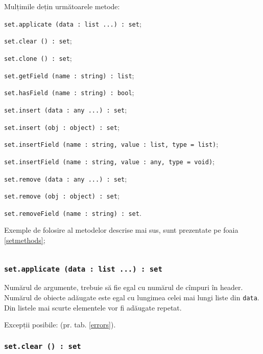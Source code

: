 Mulțimile dețin următoarele metode:
\begin{icItems}
\item \texttt{set.applicate (data : list ...) : set};
\item \texttt{set.clear () : set};
\item \texttt{set.clone () : set};
\item \texttt{set.getField (name : string) : list};
\item \texttt{set.hasField (name : string) : bool};
\item \texttt{set.insert (data : any ...) : set};
\item \texttt{set.insert (obj : object) : set};
\item \texttt{set.insertField (name : string, value : list, type = list)};
\item \texttt{set.insertField (name : string, value : any, type = void)};
\item \texttt{set.remove (data : any ...) : set};
\item \texttt{set.remove (obj : object) : set};
\item \texttt{set.removeField (name : string) : set}.
\end{icItems}

Exemple de folosire al metodelor descrise mai sus, sunt prezentate pe foaia \ref{setmethods};

\begin{sourcecode}
\label{setmethods}
\inputminted[linenos]{icl}{../sources/setmethods.icL}
\end{sourcecode}

\subsubsection{\texttt{set.applicate (data : list ...) : set}}

Numărul de argumente, trebuie să fie egal cu numărul de cîmpuri în header. Numărul de obiecte adăugate este egal cu lungimea celei mai lungi liste din \texttt{data}. Din listele mai scurte elementele vor fi adăugate repetat.

Excepții posibile:  (pr. tab. \ref{errors}).

\subsubsection{\texttt{set.clear () : set}}

